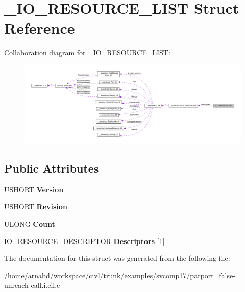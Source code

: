 \hypertarget{struct__IO__RESOURCE__LIST}{}\section{\+\_\+\+I\+O\+\_\+\+R\+E\+S\+O\+U\+R\+C\+E\+\_\+\+L\+I\+S\+T Struct Reference}
\label{struct__IO__RESOURCE__LIST}


Collaboration diagram for \+\_\+\+I\+O\+\_\+\+R\+E\+S\+O\+U\+R\+C\+E\+\_\+\+L\+I\+S\+T\+:
\nopagebreak
\begin{figure}[H]
\begin{center}
\leavevmode
\includegraphics[width=350pt]{struct__IO__RESOURCE__LIST__coll__graph}
\end{center}
\end{figure}
\subsection*{Public Attributes}
\begin{DoxyCompactItemize}
\item 
\hypertarget{struct__IO__RESOURCE__LIST_ae9a83aeb16ef7aeb6f0b7585eca7766f}{}U\+S\+H\+O\+R\+T {\bfseries Version}\label{struct__IO__RESOURCE__LIST_ae9a83aeb16ef7aeb6f0b7585eca7766f}

\item 
\hypertarget{struct__IO__RESOURCE__LIST_aa138b4b4f8856526ac3f045ac61325f4}{}U\+S\+H\+O\+R\+T {\bfseries Revision}\label{struct__IO__RESOURCE__LIST_aa138b4b4f8856526ac3f045ac61325f4}

\item 
\hypertarget{struct__IO__RESOURCE__LIST_a5cbf577d7dbc855bcf52c079b2197a2d}{}U\+L\+O\+N\+G {\bfseries Count}\label{struct__IO__RESOURCE__LIST_a5cbf577d7dbc855bcf52c079b2197a2d}

\item 
\hypertarget{struct__IO__RESOURCE__LIST_aefaeb171def891b268935822f09810b8}{}\hyperlink{struct__IO__RESOURCE__DESCRIPTOR}{I\+O\+\_\+\+R\+E\+S\+O\+U\+R\+C\+E\+\_\+\+D\+E\+S\+C\+R\+I\+P\+T\+O\+R} {\bfseries Descriptors} \mbox{[}1\mbox{]}\label{struct__IO__RESOURCE__LIST_aefaeb171def891b268935822f09810b8}

\end{DoxyCompactItemize}


The documentation for this struct was generated from the following file\+:\begin{DoxyCompactItemize}
\item 
/home/arnabd/workspace/civl/trunk/examples/svcomp17/parport\+\_\+false-\/unreach-\/call.\+i.\+cil.\+c\end{DoxyCompactItemize}
